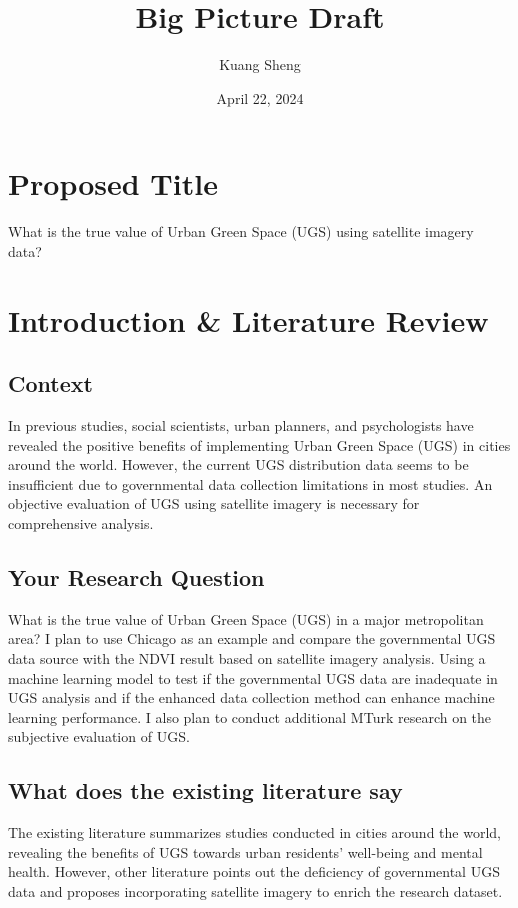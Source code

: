 \documentclass{article}
\title{Big Picture Draft}
\author{Kuang Sheng}
\date{April 22, 2024}
\begin{document}
\maketitle
 

\section*{Proposed Title}
What is the true value of Urban Green Space (UGS) using satellite imagery data?

\section{Introduction \& Literature Review}

\subsection*{Context}
In previous studies, social scientists, urban planners, and psychologists have revealed the positive benefits of implementing Urban Green Space (UGS) in cities around the world. However, the current UGS distribution data seems to be insufficient due to governmental data collection limitations in most studies. An objective evaluation of UGS using satellite imagery is necessary for comprehensive analysis.


\subsection*{Your Research Question}
What is the true value of Urban Green Space (UGS) in a major metropolitan area? I plan to use Chicago as an example and compare the governmental UGS data source with the NDVI result based on satellite imagery analysis. Using a machine learning model to test if the governmental UGS data are inadequate in UGS analysis and if the enhanced data collection method can enhance machine learning performance. I also plan to conduct additional MTurk research on the subjective evaluation of UGS.

\subsection*{What does the existing literature say}
The existing literature summarizes studies conducted in cities around the world, revealing the benefits of UGS towards urban residents' well-being and mental health. However, other literature points out the deficiency of governmental UGS data and proposes incorporating satellite imagery to enrich the research dataset.
\end{document}
